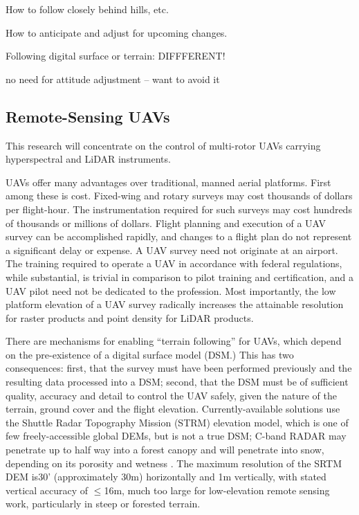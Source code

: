 \documentclass[10pt,a4paper]{report}
\begin{document}
How to follow closely behind hills, etc. 

How to anticipate and adjust for upcoming changes.

Following digital surface or terrain: DIFFFERENT!

no need for attitude adjustment -- want to avoid it




\subsection{Remote-Sensing UAVs}

This research will concentrate on the control of multi-rotor UAVs carrying hyperspectral and LiDAR instruments.

UAVs offer many advantages over traditional, manned aerial platforms. First among these is cost. Fixed-wing and rotary surveys may cost thousands of dollars per flight-hour. The instrumentation required for such surveys may cost hundreds of thousands or millions  of dollars. Flight planning and execution of a UAV survey can be accomplished rapidly, and changes to a flight plan do not represent a significant delay or expense. A UAV survey need not originate at an airport. The training required to operate a UAV in accordance with federal regulations, while substantial, is trivial in comparison to pilot training and certification, and a UAV pilot need not be dedicated to the profession. Most importantly, the low platform elevation of a UAV survey radically increases the attainable resolution for raster products and point density for LiDAR products.

There are mechanisms for enabling “terrain following” for UAVs, which depend on the pre-existence of a digital surface model (DSM.) This has two consequences: first, that the survey must have been performed previously and the resulting data processed into a DSM; second, that the DSM must be of sufficient quality, accuracy and detail to control the UAV safely, given the nature of the terrain, ground cover and the flight elevation. Currently-available solutions use the Shuttle Radar Topography Mission (STRM) elevation model, which is one of few freely-accessible global DEMs, but is not a true DSM; C-band RADAR may penetrate up to half way into a forest canopy \cite{Carabajal2005} and will penetrate into snow, depending on its porosity and wetness \cite{Tighe2009}. The maximum resolution of the SRTM DEM is30' (approximately 30m) horizontally and 1m vertically, with stated vertical accuracy of $\leq$16m, much too large for low-elevation remote sensing work, particularly in steep or forested terrain.  
\end{document}

